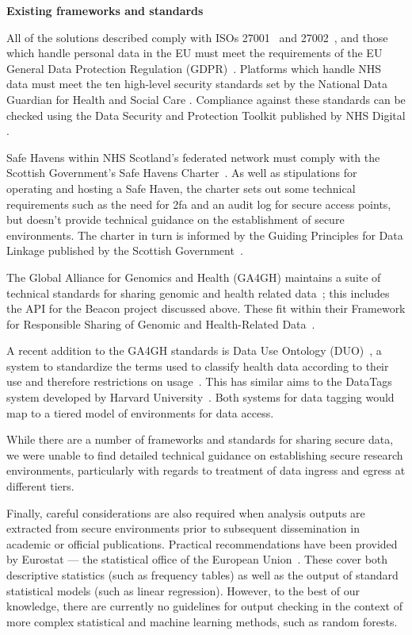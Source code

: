 \documentclass[10pt,a4paper,twocolumn]{article}
\begin{document}
\textbf{Existing frameworks and standards}

All of the solutions described comply with ISOs 27001~\cite{ISO27001} and 27002~\cite{ISO27002}, and those which handle personal data in the EU must meet the requirements of the EU General Data Protection Regulation (GDPR)~\cite{GDPR}. 
Platforms which handle NHS data must meet the ten high-level security standards set by the National Data Guardian for Health and Social Care \cite{DataGuardian}. Compliance against these standards can be checked using the Data Security and Protection Toolkit published by NHS Digital \cite{DSPToolkit}.

Safe Havens within NHS Scotland’s federated network must comply with the Scottish Government’s Safe Havens Charter~\cite{SafeHavensCharter}. As well as stipulations for operating and hosting a Safe Haven, the charter sets out some technical requirements such as the need for 2fa and an audit log for secure access points, but doesn't provide technical guidance on the establishment of secure environments. The charter in turn is informed by the Guiding Principles for Data Linkage published by the Scottish Government~\cite{DataLinkage}.

The Global Alliance for Genomics and Health (GA4GH) maintains a suite of technical standards for sharing genomic and health related data~\cite{GenomicDataToolkit}; this includes the API for the Beacon project discussed above. These fit within their Framework for Responsible Sharing of Genomic and Health-Related Data~\cite{GenomicSharingFramework}.

A recent addition to the GA4GH standards is Data Use Ontology (DUO)~\cite{DUO}, a system to standardize the terms used to classify health data according to their use and therefore restrictions on usage~\cite{dyke2016consent}.  This has similar aims to the DataTags system developed by Harvard University~\cite{Datatags}. Both systems for data tagging would map to a tiered model of environments for data access.

While there are a number of frameworks and standards for sharing secure data, we were unable to find detailed technical guidance on establishing secure research environments, particularly with regards to treatment of data ingress and egress at different tiers. 

Finally, careful considerations are also required when analysis outputs are extracted from secure environments prior to subsequent dissemination in academic or official publications. Practical recommendations have been provided by Eurostat — the statistical office of the European Union~\cite{eurostat}. These cover both descriptive statistics (such as frequency tables) as well as the output of standard statistical models (such as linear regression). However, to the best of our knowledge, there are currently no guidelines for output checking in the context of more complex statistical and machine learning methods, such as random forests.
\end{document}
